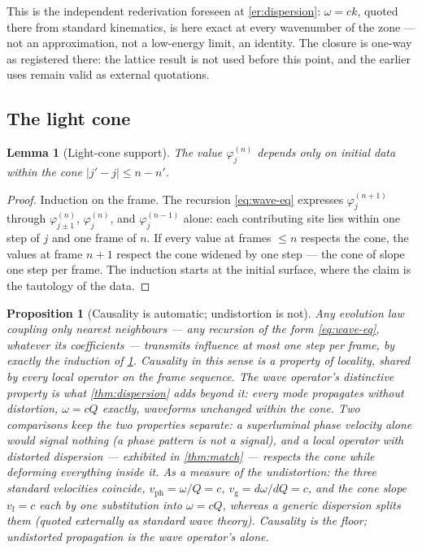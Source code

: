 \documentclass[11pt]{amsbook}
\theoremstyle{plain}
\newtheorem{proposition}[theorem]{Proposition}
\newtheorem{lemma}[theorem]{Lemma}
\theoremstyle{definition}
\theoremstyle{remark}
\newcommand{\uses}[1]{\par\nopagebreak\noindent{\footnotesize\emph{Uses: #1.}\par}}
\begin{document}
This is the independent rederivation foreseen at \cref{er:dispersion}: $\omega = ck$, quoted there from standard kinematics, is here exact at every wavenumber of the zone --- not an approximation, not a low-energy limit, an identity. The closure is one-way as registered there: the lattice result is not used before this point, and the earlier uses remain valid as external quotations.

\subsection{The light cone}\label{sec:lightcone}

\begin{lemma}[Light-cone support]\label{lem:lightcone}
The value $\varphi_{j}^{(n)}$ depends only on initial data within the cone $|j' - j| \leq n - n'$.
\uses{\cref{eq:wave-eq}}
\end{lemma}

\begin{proof}
Induction on the frame. The recursion \cref{eq:wave-eq} expresses $\varphi_{j}^{(n+1)}$ through $\varphi_{j\pm1}^{(n)}$, $\varphi_{j}^{(n)}$, and $\varphi_{j}^{(n-1)}$ alone: each contributing site lies within one step of $j$ and one frame of $n$. If every value at frames $\leq n$ respects the cone, the values at frame $n+1$ respect the cone widened by one step --- the cone of slope one step per frame. The induction starts at the initial surface, where the claim is the tautology of the data.
\end{proof}

\begin{proposition}[Causality is automatic; undistortion is not]\label{prop:causal-auto}
Any evolution law coupling only nearest neighbours --- any recursion of the form \cref{eq:wave-eq}, whatever its coefficients --- transmits influence at most one step per frame, by exactly the induction of \cref{lem:lightcone}. Causality in this sense is a property of \emph{locality}, shared by every local operator on the frame sequence. The wave operator's distinctive property is what \cref{thm:dispersion} adds beyond it: every mode propagates \emph{without distortion}, $\omega = cQ$ exactly, waveforms unchanged within the cone. Two comparisons keep the two properties separate: a superluminal \emph{phase} velocity alone would signal nothing (a phase pattern is not a signal), and a local operator with distorted dispersion --- exhibited in \cref{thm:match} --- respects the cone while deforming everything inside it. As a measure of the undistortion: the three standard velocities coincide, $v_{\mathrm{ph}} = \omega/Q = c$, $v_{\mathrm{g}} = d\omega/dQ = c$, and the cone slope $v_{\mathrm{f}} = c$ each by one substitution into $\omega = cQ$, whereas a generic dispersion splits them (quoted externally as standard wave theory). Causality is the floor; undistorted propagation is the wave operator's alone.
\uses{\cref{lem:lightcone}, \cref{thm:dispersion}}
\end{proposition}
\end{document}
